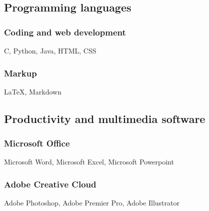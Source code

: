 \documentclass{article}
\begin{document}
\subsection{\textbf{Programming languages}}

\subsubsection{Coding and web development}
C, Python, Java, HTML, CSS

\subsubsection{Markup}
\LaTeX , Markdown

\subsection{\textbf{Productivity and multimedia software}}

\subsubsection{Microsoft Office}
Microsoft Word, Microsoft Excel, Microsoft Powerpoint

\subsubsection{Adobe Creative Cloud}
Adobe Photoshop, Adobe Premier Pro, Adobe Illustrator
\end{document}
